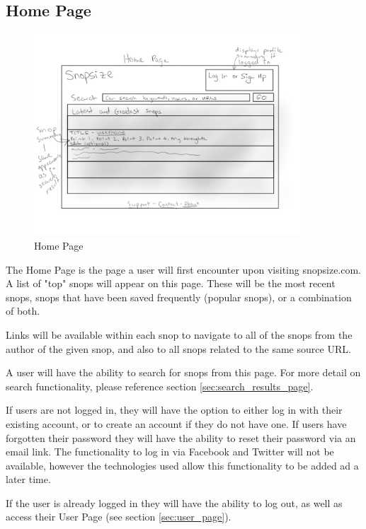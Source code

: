 \documentclass[11pt]{article}
\begin{document}
\subsection{Home Page}
\begin{figure}[htb]
\begin{center}
\includegraphics[width=0.9\textwidth]{home_page.png}
\caption{Home Page}
\label{fig:fig_home_page}
\end{center}
\end{figure}
The Home Page is the page a user will first encounter upon visiting snopsize.com. A list of "top" snops will appear on this page. These will be the most recent snops, snops that have been saved frequently (popular snops), or a combination of both.

Links will be available within each snop to navigate to all of the snops from the author of the given snop, and also to all snops related to the same source URL.

A user will have the ability to search for snops from this page. For more detail on search functionality, please reference section \ref{sec:search_results_page}. 

If users are not logged in, they will have the option to either log in with their existing account, or to create an account if they do not have one. If users have forgotten their password they will have the ability to reset their password via an email link. The functionality to log in via Facebook and Twitter will not be available, however the technologies used allow this functionality to be added ad a later time.

If the user is already logged in they will have the ability to log out, as well as access their User Page (see section \ref{sec:user_page}). 
\end{document}
